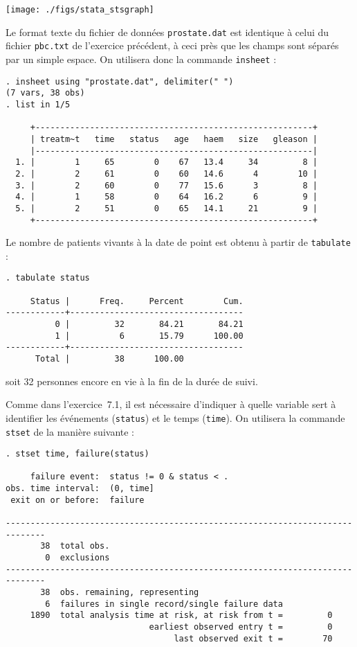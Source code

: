 \texttt{[image: ./figs/stata\_stsgraph]}


\soln{\ref{exo:11.2}}
Le format texte du fichier de données \texttt{prostate.dat} est identique à
celui du fichier \texttt{pbc.txt} de l'exercice précédent, à ceci près que
les champs sont séparés par un simple espace. On utilisera donc la commande
\texttt{insheet} :
\begin{verbatim}
. insheet using "prostate.dat", delimiter(" ")
(7 vars, 38 obs)
. list in 1/5

     +--------------------------------------------------------+
     | treatm~t   time   status   age   haem   size   gleason |
     |--------------------------------------------------------|
  1. |        1     65        0    67   13.4     34         8 |
  2. |        2     61        0    60   14.6      4        10 |
  3. |        2     60        0    77   15.6      3         8 |
  4. |        1     58        0    64   16.2      6         9 |
  5. |        2     51        0    65   14.1     21         9 |
     +--------------------------------------------------------+
\end{verbatim}
Le nombre de patients vivants à la date de point est obtenu à partir de
\texttt{tabulate} :
\begin{verbatim}
. tabulate status

     Status |      Freq.     Percent        Cum.
------------+-----------------------------------
          0 |         32       84.21       84.21
          1 |          6       15.79      100.00
------------+-----------------------------------
      Total |         38      100.00
\end{verbatim}
soit 32 personnes encore en vie à la fin de la durée de suivi.

Comme dans l'exercice~7.1, il est nécessaire d'indiquer à \Stata quelle
variable sert à identifier les événements (\texttt{status}) et le temps
(\texttt{time}). On utilisera la commande \texttt{stset} de la manière
suivante :
\begin{verbatim}
. stset time, failure(status)

     failure event:  status != 0 & status < .
obs. time interval:  (0, time]
 exit on or before:  failure

------------------------------------------------------------------------------
       38  total obs.
        0  exclusions
------------------------------------------------------------------------------
       38  obs. remaining, representing
        6  failures in single record/single failure data
     1890  total analysis time at risk, at risk from t =         0
                             earliest observed entry t =         0
                                  last observed exit t =        70
\end{verbatim}


